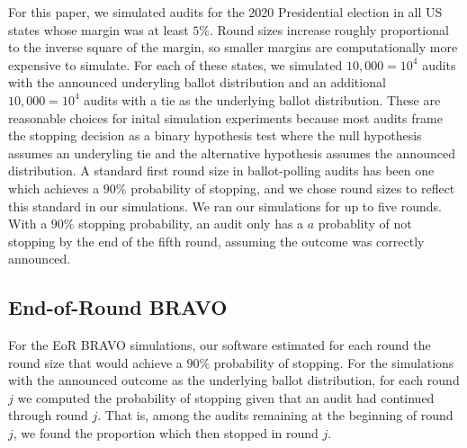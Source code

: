 \documentclass{article}
\begin{document}
For this paper, we simulated audits for 
the 2020 Presidential election
in all US states whose margin was at least $5\%$.
Round sizes increase roughly proportional to the inverse
square of the margin, so 
smaller margins are computationally more expensive to simulate.
For each of these states, we simulated 
$10,000=10^4$ audits with the announced
underyling ballot distribution
and an additional $10,000=10^4$ audits with a tie
as the underlying ballot distribution.
These are reasonable choices for inital simulation experiments
because most audits frame the stopping decision as a binary
hypothesis test where the null hypothesis assumes an underyling tie
and the alternative hypothesis assumes the announced distribution.
A standard first round size in ballot-polling audits
has been one which achieves a $90\%$ probability
of stopping, and we chose round sizes to reflect this standard
in our simulations.
We ran our simulations for up to five rounds.
With a $90\%$ stopping probability, 
an audit only has a $a$ probablity of not stopping
by the end of the fifth round, assuming the outcome was correctly
announced.


\subsection{End-of-Round BRAVO}
For the EoR BRAVO simulations, our software estimated for each round
the round size that would achieve a $90\%$ probability of stopping.
For the simulations with the announced outcome as the underlying
ballot distribution, for each round $j$ we computed the probability
of stopping given that an audit had continued through round $j$.
That is, among the audits remaining at the beginning of round $j$, 
we found the proportion which then stopped in round $j$.
\end{document}
